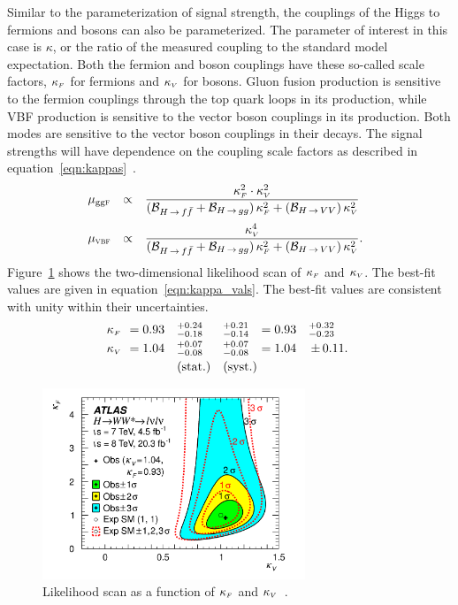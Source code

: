 Similar to the parameterization of signal strength, the couplings of the Higgs to fermions and bosons can also be parameterized. The parameter of interest in this case is $\kappa$, or the ratio of the measured coupling to the standard model expectation. Both the fermion and boson couplings have these so-called scale factors, $\kappa_{\mbox{\tiny $F$}}$ for fermions and $\kappa_{\mbox{\tiny $V$}}$ for bosons. Gluon fusion production is sensitive to the fermion couplings through the top quark loops in its production, while VBF production is sensitive to the vector boson couplings in its production. Both modes are sensitive to the vector boson couplings in their decays. The signal strengths will have dependence on the coupling scale factors as described in equation~\ref{eqn:kappas}~\cite{LHCXSWG}. 
%
\begin{equation}
\np%
\begin{array}{lc l}
  \mu_{\scggF} &\propto &{\displaystyle\frac{\kF^2 \cdot \kV^2}{(\BF_{\Hff}+\BF_{\Hgg})\,\kF^2+(\BF_{\HVV})\,\kV^2}}\\ \clineskip\clineskip
  \mu_{\scVBF} &\propto &{\displaystyle\frac{\kV^4            }{(\BF_{\Hff}+\BF_{\Hgg})\,\kF^2+(\BF_{\HVV})\,\kV^2}} . 
\end{array}
\label{eqn:kappas}
\end{equation}
%
Figure~\ref{fig:kappas} shows the two-dimensional likelihood scan of $\kappa_{\mbox{\tiny $F$}}$ and $\kappa_{\mbox{\tiny $V$}}$. The best-fit values are given in equation~\ref{eqn:kappa_vals}. The best-fit values are consistent with unity within their uncertainties. 
%
\begin{equation}
\begin{array}{llllll}
\no\kF\no&=0.93\no&\,\,^{+0.24}_{-0.18}\np&^{+0.21}_{-0.14}\np&=0.93&^{+0.32}_{-0.23} \\ \clineskip
\no\kV\no&=1.04\no&\,\,^{+0.07}_{-0.08}\np&^{+0.07}_{-0.08}\np&=1.04&{\PM}0.11.\\ \clineskip
                     &        & ~\textrm{(stat.)}     &\textrm{(syst.)}\np
\end{array}
\label{eqn:kappa_vals}
\end{equation}
%
\begin{figure}[h!]
  \centering
  \captionsetup{justification=centering}

  \includegraphics[width=0.7\textwidth]{figures/kappas}
  \caption{Likelihood scan as a function of $\kappa_{\mbox{\tiny $F$}}$ and $\kappa_{\mbox{\tiny $V$}}$~\cite{WW2015}.}
  \label{fig:kappas}
\end{figure}

